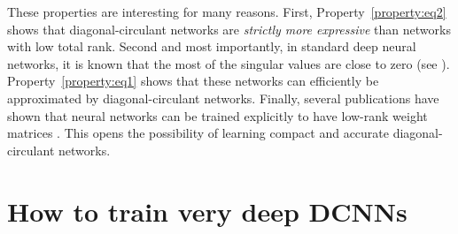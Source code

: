 These properties are interesting for many reasons. 
First, Property~\ref{property:eq2} shows that diagonal-circulant networks are \emph{strictly more expressive} than networks with low total rank. 
Second and most importantly, in standard deep neural networks, it is known that the most of the singular values are close to zero (see \eg \citet{sedghi2018iclr,Arora19neurips}).
Property~\ref{property:eq1} shows that these networks can efficiently be approximated by diagonal-circulant networks.
Finally, several publications have shown that neural networks can be trained explicitly to have low-rank weight matrices \cite{chong18eccv, goyal19}.
This opens the possibility of learning compact and accurate diagonal-circulant networks.



\section{How to train very deep DCNNs}
\label{section:training}

